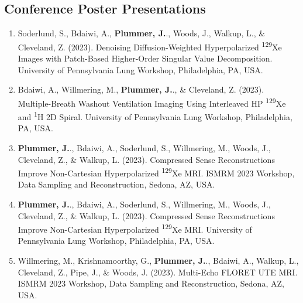 \documentclass[12pt,]{scrartcl}
\begin{document}
\subsection{Conference Poster Presentations}\label{conferences}

\begin{enumerate}
  \leftskip-0.13in %
  

  \item Soderlund, S., Bdaiwi, A., \textbf{Plummer, J.}., Woods, J., Walkup, L., \& Cleveland, Z. (2023). Denoising Diffusion-Weighted Hyperpolarized \textsuperscript{129}Xe Images with Patch-Based Higher-Order Singular Value Decomposition. University of Pennsylvania Lung Workshop, Philadelphia, PA, USA.
  
  \item Bdaiwi, A., Willmering, M., \textbf{Plummer, J.}., \& Cleveland, Z. (2023). Multiple-Breath Washout Ventilation Imaging Using Interleaved HP \textsuperscript{129}Xe and \textsuperscript{1}H 2D Spiral. University of Pennsylvania Lung Workshop, Philadelphia, PA, USA.
  
  \item \textbf{Plummer, J.}., Bdaiwi, A., Soderlund, S., Willmering, M., Woods, J., Cleveland, Z., \& Walkup, L. (2023). Compressed Sense Reconstructions Improve Non-Cartesian Hyperpolarized \textsuperscript{129}Xe MRI. ISMRM 2023 Workshop, Data Sampling and Reconstruction, Sedona, AZ, USA.  
  
  \item \textbf{Plummer, J.}., Bdaiwi, A., Soderlund, S., Willmering, M., Woods, J., Cleveland, Z., \& Walkup, L. (2023). Compressed Sense Reconstructions Improve Non-Cartesian Hyperpolarized \textsuperscript{129}Xe MRI. University of Pennsylvania Lung Workshop, Philadelphia, PA, USA.  
  
  \item Willmering, M., Krishnamoorthy, G., \textbf{Plummer, J.}., Bdaiwi, A., Walkup, L., Cleveland, Z., Pipe, J., \& Woods, J. (2023). Multi-Echo FLORET UTE MRI. ISMRM 2023 Workshop, Data Sampling and Reconstruction, Sedona, AZ, USA.  
  

\end{enumerate}
\end{document}
